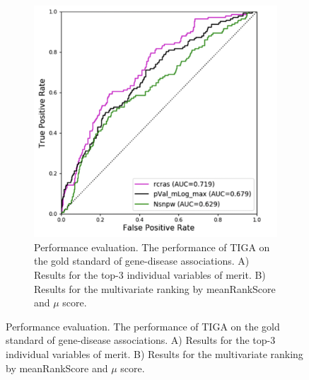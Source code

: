 \begin{figure}
\begin{subfigure}[c]{\textwidth}
	\includegraphics[width=\textwidth]{figures/tiga/FIG04_ROC_a.png}
	\caption{Performance evaluation. The performance of TIGA on the gold standard of gene-disease associations. A) Results for the top-3 individual variables of merit. B) Results for the multivariate ranking by meanRankScore and $\mu$ score.}
	\label{fig:TIGA_rocs_a}
\end{subfigure}


\end{figure}
